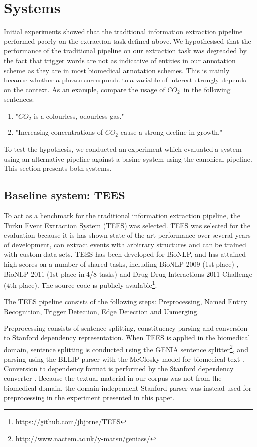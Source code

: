 \section{Systems}

Initial experiments showed that the traditional information extraction pipeline performed poorly on the extraction task defined above. We hypothesised that the performance of the traditional pipeline on our extraction task was degreaded by the fact that trigger words are not as indicative of entities in our annotation scheme as they are in most biomedical annotation schemes. This is mainly because whether a phrase corresponds to a variable of interest strongly depends on the context. As an example, compare the usage of $CO_2$ in the following sentences:

\begin{enumerate}
	\item "$CO_2$ is a colourless, odourless gas." 
	\item "Increasing concentrations of $CO_2$ cause a strong decline in growth."
\end{enumerate}

To test the hypothesis, we conducted an experiment which evaluated a system using an alternative pipeline against a basine system using the canonical pipeline. This section presents both systems.

\subsection{Baseline system: TEES}

To act as a benchmark for the traditional information extraction pipeline, the Turku Event Extraction System (TEES) \citep{bjo11ddi} was selected. TEES was selected for the evaluation because it is has shown state-of-the-art performance over several years of development, can extract events with arbitrary structures and can be trained with custom data sets. TEES has been developed for BioNLP, and has attained high scores on a number of shared tasks, including BioNLP 2009 (1st place) \citep{bjo09}, BioNLP 2011 (1st place in 4/8 tasks) \citep{bjo11} and Drug-Drug Interactions 2011 Challenge (4th place)\citep{bjo11ddi}. The source code is publicly available\footnote{\url{https://github.com/jbjorne/TEES}}.

The TEES pipeline consists of the following steps: Preprocessing, Named Entity Recognition, Trigger Detection, Edge Detection and Unmerging. 

Preprocessing consists of sentence splitting, constituency parsing and conversion to Stanford dependency representation\citep{dem08}. When TEES is applied in the biomedical domain, sentence splitting is conducted using the GENIA sentence splitter\footnote{\url{http://www.nactem.ac.uk/y-matsu/geniass/}}, and parsing using the BLLIP-parser \citep{cha05} with the McClosky model for biomedical text \citep{mcc08}. Conversion to dependency format is performed by the Stanford dependency converter \citep{dem08}. Because the textual material in our corpus was not from the biomedical domain, the domain independent Stanford parser \citep{kle03} was instead used for preprocessing in the experiment presented in this paper.

